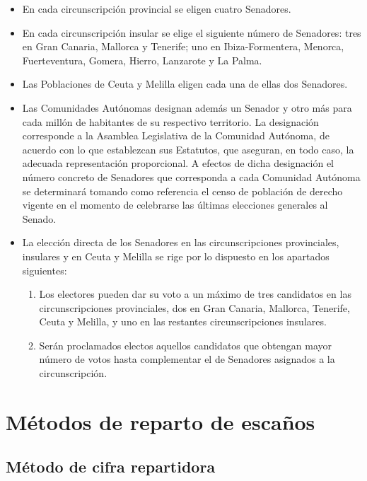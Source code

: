 \documentclass[12pt,a4paper,]{book}
\numberwithin{dummy}{section}
\theoremstyle{ocrenumbox}
\theoremstyle{blacknumex}
\theoremstyle{blacknumbox}
\theoremstyle{ocrenum}
\theoremstyle{ocrenum}
\begin{document}
\begin{itemize}
\item
  En cada circunscripción provincial se eligen cuatro Senadores.
\item
  En cada circunscripción insular se elige el siguiente número de
  Senadores: tres en Gran Canaria, Mallorca y Tenerife; uno en
  Ibiza-Formentera, Menorca, Fuerteventura, Gomera, Hierro, Lanzarote y
  La Palma.
\item
  Las Poblaciones de Ceuta y Melilla eligen cada una de ellas dos
  Senadores.
\item
  Las Comunidades Autónomas designan además un Senador y otro más para
  cada millón de habitantes de su respectivo territorio. La designación
  corresponde a la Asamblea Legislativa de la Comunidad Autónoma, de
  acuerdo con lo que establezcan sus Estatutos, que aseguran, en todo
  caso, la adecuada representación proporcional. A efectos de dicha
  designación el número concreto de Senadores que corresponda a cada
  Comunidad Autónoma se determinará tomando como referencia el censo de
  población de derecho vigente en el momento de celebrarse las últimas
  elecciones generales al Senado.
\item
  La elección directa de los Senadores en las circunscripciones
  provinciales, insulares y en Ceuta y Melilla se rige por lo dispuesto
  en los apartados siguientes:

  \begin{enumerate}
  \def\labelenumi{\alph{enumi})}
  \item
    Los electores pueden dar su voto a un máximo de tres candidatos en
    las circunscripciones provinciales, dos en Gran Canaria, Mallorca,
    Tenerife, Ceuta y Melilla, y uno en las restantes circunscripciones
    insulares.
  \item
    Serán proclamados electos aquellos candidatos que obtengan mayor
    número de votos hasta complementar el de Senadores asignados a la
    circunscripción.
  \end{enumerate}
\end{itemize}

\hypertarget{muxe9todos-de-reparto-de-escauxf1os}{%
\chapter{Métodos de reparto de
escaños}\label{muxe9todos-de-reparto-de-escauxf1os}}

\hypertarget{muxe9todo-de-cifra-repartidora}{%
\section{Método de cifra
repartidora}\label{muxe9todo-de-cifra-repartidora}}
\end{document}
